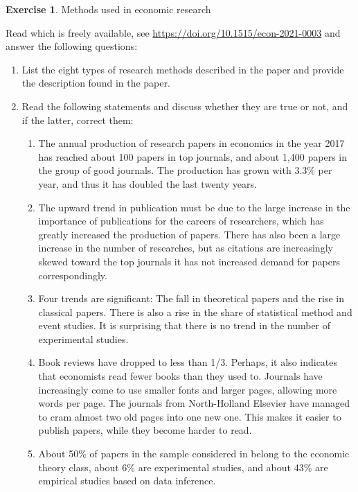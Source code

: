 \documentclass[
  12pt,
  oneside]{book}
\providecommand{\tightlist}{%
  \setlength{\itemsep}{0pt}\setlength{\parskip}{0pt}}
\theoremstyle{definition}
\theoremstyle{definition}
\theoremstyle{definition}
\newtheorem{exercise}{Exercise}[chapter]
\theoremstyle{definition}
\theoremstyle{remark}
\begin{document}
\begin{exercise}
\protect\hypertarget{exr:methodsinresearch}{}\label{exr:methodsinresearch}Methods used in economic research

Read \citet{Paldam2021Methods} which is freely available, see \url{https://doi.org/10.1515/econ-2021-0003} and answer the following questions:

\begin{enumerate}
\def\labelenumi{\alph{enumi})}
\tightlist
\item
  List the eight types of research methods described in the paper and provide the description found in the paper.
\item
  Read the following statements and discuss whether they are true or not, and if the latter, correct them:

  \begin{enumerate}
  \def\labelenumii{\roman{enumii})}
  \tightlist
  \item
    The annual production of research papers in economics in the year 2017 has reached about 100 papers in top journals, and about 1,400 papers in the group of good journals. The production has grown with 3.3\% per year, and thus it has doubled the last twenty years.
  \item
    The upward trend in publication must be due to the large increase in the importance of publications for the careers of researchers, which has greatly increased the production of papers. There has also been a large increase in the number of researches, but as citations are increasingly skewed toward the top journals it has not increased demand for papers correspondingly.
  \item
    Four trends are significant: The fall in theoretical papers and the rise in classical papers. There is also a rise in the share of statistical method and event studies. It is surprising that there is no trend in the number of experimental studies.
  \item
    Book reviews have dropped to less than 1/3. Perhaps, it also indicates that economists read fewer books than they used to. Journals have increasingly come to use smaller fonts and larger pages, allowing more words per page. The journals from North-Holland Elsevier have managed to cram almost two old pages into one new one. This makes it easier to publish papers, while they become harder to read.
  \item
    About 50\% of papers in the sample considered in \cite{Paldam2021Methods} belong to the economic theory class, about 6\% are experimental studies, and about 43\% are empirical studies based on data inference.

\end{enumerate}
\end{enumerate}
\end{exercise}
\end{document}
